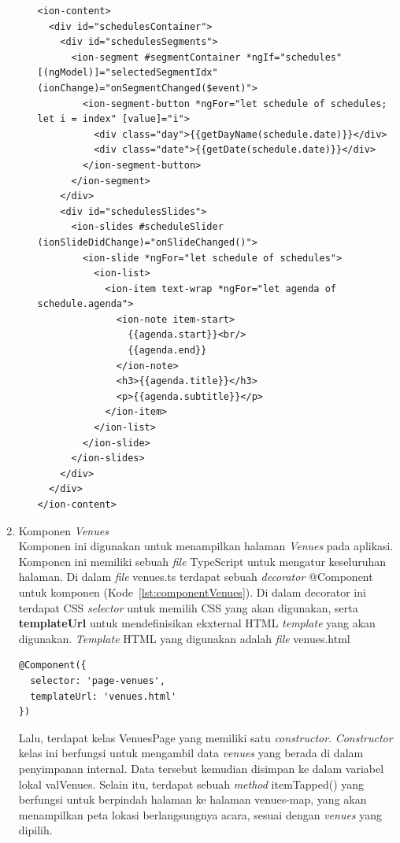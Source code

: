 \begin{enumerate}
\begin{itemize}
\begin{lstlisting}[label={lst:contentSchedule}, caption=\textit{Content} pada schedule.html]
<ion-content>
  <div id="schedulesContainer">
    <div id="schedulesSegments">
      <ion-segment #segmentContainer *ngIf="schedules" [(ngModel)]="selectedSegmentIdx" (ionChange)="onSegmentChanged($event)">
        <ion-segment-button *ngFor="let schedule of schedules; let i = index" [value]="i">
          <div class="day">{{getDayName(schedule.date)}}</div>
          <div class="date">{{getDate(schedule.date)}}</div>
        </ion-segment-button>
      </ion-segment>
    </div>
    <div id="schedulesSlides">
      <ion-slides #scheduleSlider (ionSlideDidChange)="onSlideChanged()">
        <ion-slide *ngFor="let schedule of schedules">
          <ion-list>
            <ion-item text-wrap *ngFor="let agenda of schedule.agenda">
              <ion-note item-start>
                {{agenda.start}}<br/>
                {{agenda.end}}
              </ion-note>
              <h3>{{agenda.title}}</h3>
              <p>{{agenda.subtitle}}</p>
            </ion-item>
          </ion-list>
        </ion-slide>
      </ion-slides>
    </div>
  </div>
</ion-content>
\end{lstlisting} 
		
	\end{itemize}
	
	\newpage

	\item Komponen \textit{Venues} \\
	Komponen ini digunakan untuk menampilkan halaman \textit{Venues} pada aplikasi. Komponen ini memiliki sebuah \textit{file} TypeScript untuk mengatur keseluruhan halaman. Di dalam \textit{file} venues.ts terdapat sebuah \textit{decorator} @Component untuk komponen (Kode~\ref{lst:componentVenues}). Di dalam decorator ini terdapat CSS \textit{selector} untuk memilih CSS yang akan digunakan, serta \textbf{templateUrl} untuk mendefinisikan ekxternal HTML \textit{template} yang akan digunakan. \textit{Template} HTML yang digunakan adalah \textit{file} venues.html
	
\begin{lstlisting}[label={lst:componentVenues}, caption=@Component pada venues.ts]
@Component({
  selector: 'page-venues',
  templateUrl: 'venues.html'
})
\end{lstlisting}

	Lalu, terdapat kelas VenuesPage yang memiliki satu \textit{constructor}. \textit{Constructor} kelas ini berfungsi untuk mengambil data \textit{venues} yang berada di dalam penyimpanan internal. Data tersebut kemudian disimpan ke dalam variabel lokal valVenues. Selain itu, terdapat sebuah \textit{method} itemTapped() yang berfungsi untuk berpindah halaman ke halaman venues-map, yang akan menampilkan peta lokasi berlangsungnya acara, sesuai dengan \textit{venues} yang dipilih.


\end{enumerate}
